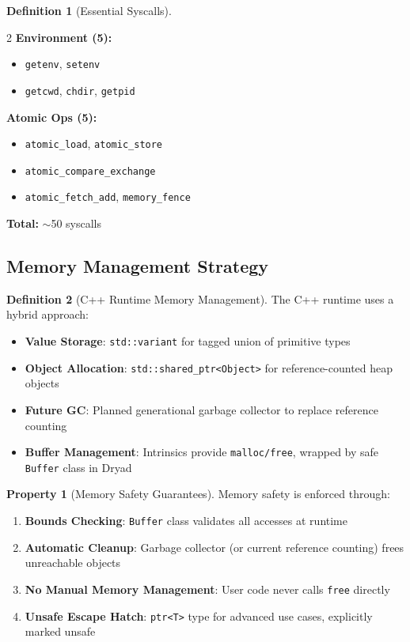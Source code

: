 \documentclass[12pt,a4paper]{article}
\theoremstyle{definition}
\newtheorem{definition}{Definition}[section]
\newtheorem{property}{Property}[section]
\begin{document}
\begin{definition}[Essential Syscalls]
\begin{multicols}{2}
\textbf{Environment (5):}
\begin{itemize}[noitemsep]
    \item \texttt{getenv}, \texttt{setenv}
    \item \texttt{getcwd}, \texttt{chdir}, \texttt{getpid}
\end{itemize}

\textbf{Atomic Ops (5):}
\begin{itemize}[noitemsep]
    \item \texttt{atomic\_load}, \texttt{atomic\_store}
    \item \texttt{atomic\_compare\_exchange}
    \item \texttt{atomic\_fetch\_add}, \texttt{memory\_fence}
\end{itemize}
\end{multicols}

\textbf{Total:} $\sim$50 syscalls
\end{definition}

\subsection{Memory Management Strategy}

\begin{definition}[C++ Runtime Memory Management]
The C++ runtime uses a hybrid approach:

\begin{itemize}[leftmargin=*]
    \item \textbf{Value Storage}: \texttt{std::variant} for tagged union of primitive types
    \item \textbf{Object Allocation}: \texttt{std::shared\_ptr<Object>} for reference-counted heap objects
    \item \textbf{Future GC}: Planned generational garbage collector to replace reference counting
    \item \textbf{Buffer Management}: Intrinsics provide \texttt{malloc/free}, wrapped by safe \texttt{Buffer} class in Dryad
\end{itemize}
\end{definition}

\begin{property}[Memory Safety Guarantees]
Memory safety is enforced through:
\begin{enumerate}[leftmargin=*]
    \item \textbf{Bounds Checking}: \texttt{Buffer} class validates all accesses at runtime
    \item \textbf{Automatic Cleanup}: Garbage collector (or current reference counting) frees unreachable objects
    \item \textbf{No Manual Memory Management}: User code never calls \texttt{free} directly
    \item \textbf{Unsafe Escape Hatch}: \texttt{ptr<T>} type for advanced use cases, explicitly marked unsafe
\end{enumerate}
\end{property}
\end{document}
